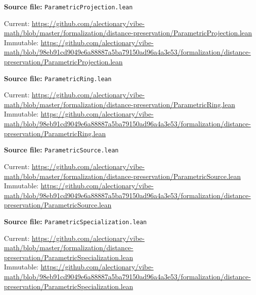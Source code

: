 \par\smallskip\noindent\begin{minipage}{\linewidth}\small\setlength{\baselineskip}{11pt}
\textbf{Source file:} \nolinkurl{ParametricProjection.lean}\par\nopagebreak
Current: \url{https://github.com/alectionary/vibe-math/blob/master/formalization/distance-preservation/ParametricProjection.lean}\\
Immutable: \url{https://github.com/alectionary/vibe-math/blob/98eb91cd9049e6a88887a5ba79150ad96a4a3e53/formalization/distance-preservation/ParametricProjection.lean}\par\end{minipage}\par
\par\smallskip\noindent\begin{minipage}{\linewidth}\small\setlength{\baselineskip}{11pt}
\textbf{Source file:} \nolinkurl{ParametricRing.lean}\par\nopagebreak
Current: \url{https://github.com/alectionary/vibe-math/blob/master/formalization/distance-preservation/ParametricRing.lean}\\
Immutable: \url{https://github.com/alectionary/vibe-math/blob/98eb91cd9049e6a88887a5ba79150ad96a4a3e53/formalization/distance-preservation/ParametricRing.lean}\par\end{minipage}\par
\par\smallskip\noindent\begin{minipage}{\linewidth}\small\setlength{\baselineskip}{11pt}
\textbf{Source file:} \nolinkurl{ParametricSource.lean}\par\nopagebreak
Current: \url{https://github.com/alectionary/vibe-math/blob/master/formalization/distance-preservation/ParametricSource.lean}\\
Immutable: \url{https://github.com/alectionary/vibe-math/blob/98eb91cd9049e6a88887a5ba79150ad96a4a3e53/formalization/distance-preservation/ParametricSource.lean}\par\end{minipage}\par
\par\smallskip\noindent\begin{minipage}{\linewidth}\small\setlength{\baselineskip}{11pt}
\textbf{Source file:} \nolinkurl{ParametricSpecialization.lean}\par\nopagebreak
Current: \url{https://github.com/alectionary/vibe-math/blob/master/formalization/distance-preservation/ParametricSpecialization.lean}\\
Immutable: \url{https://github.com/alectionary/vibe-math/blob/98eb91cd9049e6a88887a5ba79150ad96a4a3e53/formalization/distance-preservation/ParametricSpecialization.lean}\par\end{minipage}\par
